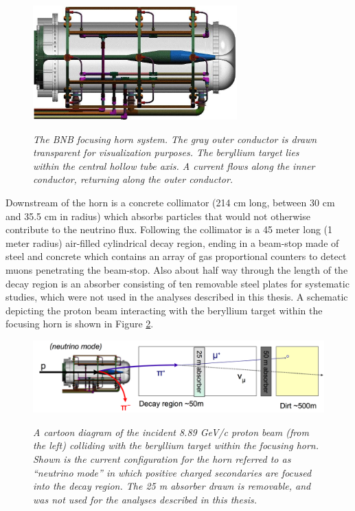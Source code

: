 \begin{figure}[ht!]
\centering
	\includegraphics[width=0.7\textwidth]{Figures/BNB_horn_schematic.png} \\
\caption{\textit{The BNB focusing horn system. The gray outer conductor is drawn transparent for visualization purposes. The beryllium target lies within the central hollow tube axis. A current flows along the inner conductor, returning along the outer conductor.}}\label{BNB_horn_schematic}
\end{figure}

Downstream of the horn is a concrete collimator (214 cm long, between 30 cm and 35.5 cm in radius) which absorbs particles that would not otherwise contribute to the neutrino flux. Following the collimator is a 45 meter long (1 meter radius) air-filled cylindrical decay region, ending in a beam-stop made of steel and concrete which contains an array of gas proportional counters to detect muons penetrating the beam-stop. Also about half way through the length of the decay region is an absorber consisting of ten removable steel plates for systematic studies, which were not used in the analyses described in this thesis. A schematic depicting the proton beam interacting with the beryllium target within the focusing horn is shown in Figure \ref{BNB_numode_fig}.

\begin{figure}[ht!]
\centering
	\includegraphics[width=1.0\textwidth]{Figures/BNB_numode_fig.png} \\
\caption{\textit{A cartoon diagram of the incident 8.89 GeV/c proton beam (from the left) colliding with the beryllium target within the focusing horn. Shown is the current configuration for the horn referred to as ``neutrino mode'' in which positive charged secondaries are focused into the decay region. The 25 m absorber drawn is removable, and was not used for the analyses described in this thesis.}}\label{BNB_numode_fig}
\end{figure}



